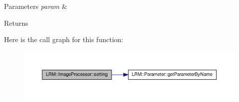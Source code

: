 \begin{DoxyParams}{\-Parameters}
{\em param} & \\
\hline
\end{DoxyParams}
\begin{DoxyReturn}{\-Returns}

\end{DoxyReturn}


\-Here is the call graph for this function\-:\nopagebreak
\begin{figure}[H]
\begin{center}
\leavevmode
\includegraphics[width=350pt]{classLRM_1_1ImageProcessor_aa5ddc6b267ccb4afcb3871fc730f2c93_cgraph}
\end{center}
\end{figure}


